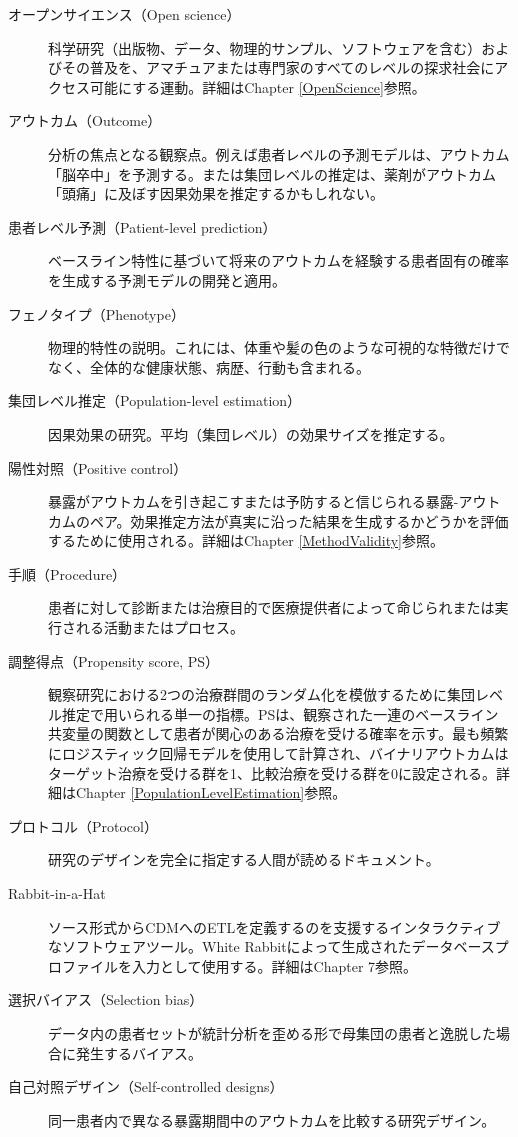 \documentclass[
  11pt]{book}
\theoremstyle{definition}
\theoremstyle{definition}
\theoremstyle{definition}
\theoremstyle{definition}
\theoremstyle{remark}
\begin{document}
\begin{description}
\item[オープンサイエンス（Open science）]
科学研究（出版物、データ、物理的サンプル、ソフトウェアを含む）およびその普及を、アマチュアまたは専門家のすべてのレベルの探求社会にアクセス可能にする運動。詳細はChapter \ref{OpenScience}参照。
\item[アウトカム（Outcome）]
分析の焦点となる観察点。例えば患者レベルの予測モデルは、アウトカム「脳卒中」を予測する。または集団レベルの推定は、薬剤がアウトカム「頭痛」に及ぼす因果効果を推定するかもしれない。
\item[患者レベル予測（Patient-level prediction）]
ベースライン特性に基づいて将来のアウトカムを経験する患者固有の確率を生成する予測モデルの開発と適用。
\item[フェノタイプ（Phenotype）]
物理的特性の説明。これには、体重や髪の色のような可視的な特徴だけでなく、全体的な健康状態、病歴、行動も含まれる。
\item[集団レベル推定（Population-level estimation）]
因果効果の研究。平均（集団レベル）の効果サイズを推定する。
\item[陽性対照（Positive control）]
暴露がアウトカムを引き起こすまたは予防すると信じられる暴露-アウトカムのペア。効果推定方法が真実に沿った結果を生成するかどうかを評価するために使用される。詳細はChapter \ref{MethodValidity}参照。
\item[手順（Procedure）]
患者に対して診断または治療目的で医療提供者によって命じられまたは実行される活動またはプロセス。
\item[調整得点（Propensity score, PS）]
観察研究における2つの治療群間のランダム化を模倣するために集団レベル推定で用いられる単一の指標。PSは、観察された一連のベースライン共変量の関数として患者が関心のある治療を受ける確率を示す。最も頻繁にロジスティック回帰モデルを使用して計算され、バイナリアウトカムはターゲット治療を受ける群を1、比較治療を受ける群を0に設定される。詳細はChapter \ref{PopulationLevelEstimation}参照。
\item[プロトコル（Protocol）]
研究のデザインを完全に指定する人間が読めるドキュメント。
\item[Rabbit-in-a-Hat]
ソース形式からCDMへのETLを定義するのを支援するインタラクティブなソフトウェアツール。White Rabbitによって生成されたデータベースプロファイルを入力として使用する。詳細はChapter 7参照。
\item[選択バイアス（Selection bias）]
データ内の患者セットが統計分析を歪める形で母集団の患者と逸脱した場合に発生するバイアス。
\item[自己対照デザイン（Self-controlled designs）]
同一患者内で異なる暴露期間中のアウトカムを比較する研究デザイン。

\end{description}
\end{document}
